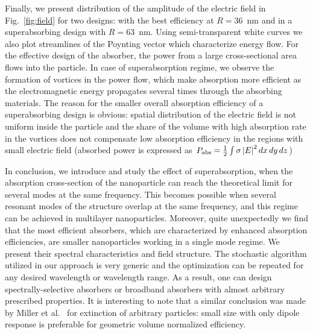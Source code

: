 \documentclass[aps,prl,twocolumn,showpacs,superscriptaddress,groupedaddress]{revtex4-1}
\begin{document}
\begin{figure}
\end{figure}
Finally, we present distribution of the amplitude of the electric
field in Fig.~\ref{fig:field} for two designs: with the best
efficiency at $R=36$~nm and in a superabsorbing design with $R=63$~nm.
Using semi-transparent white curves we also plot streamlines of the
Poynting vector which characterize energy flow.  For the effective
design of the absorber, the power from a large cross-sectional area
flows into the particle.  In case of superabsorption regime, we
observe the formation of vortices in the power flow, which make
absorption more efficient as the electromagnetic energy propagates
several times through the absorbing materials.  The reason for the
smaller overall absorption efficiency of a superabsorbing design is
obvious: spatial distribution of the electric field is not uniform
inside the particle and the share of the volume with high absorption
rate in the vortices does not compensate low absorption efficiency in
the regions with small electric field (absorbed power is expressed as
$P_{\rm abs}=\frac{1}{2}\int\sigma \left|E\right|^2dx\,dy\,dz$)

In conclusion, we introduce and study the effect of superabsorption,
when the absorption cross-section of the nanoparticle can reach the
theoretical limit for several modes at the same frequency. This
becomes possible when several resonant modes of the structure overlap
at the same frequency, and this regime can be achieved in multilayer
nanoparticles. Moreover, quite unexpectedly we find that the most
efficient absorbers, which are characterized by enhanced absorption
efficiencies, are smaller nanoparticles working in a single mode
regime. We present their spectral characteristics and field structure.
The stochastic algorithm utilized in our approach is very generic and
the optimization can be repeated for any desired wavelength or
wavelength range.  As a result, one can design spectrally-selective
absorbers or broadband absorbers with almost arbitrary prescribed
properties.  It is interesting to note that a similar conclusion was
made by Miller et al.~\cite{Miller-2014} for extinction of arbitrary
particles: small size with only dipole response is preferable for
geometric volume normalized efficiency.
\end{document}

